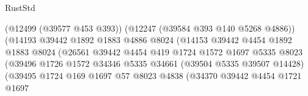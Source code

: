 \begin{lexlean}{RustStd}
\begin{coremodule}
{\begin{coremodule}
{{{{{{{{{{{{{{{{{{{{{{{{{{{{{{{{{{{{{{{{{{{{{{{{{{{{{{{{{{{{{{{{{{{{{{{{{{{{{{{{                                                (@12499 (@39577 @453 @393))
                                                (@12247 (@39584 @393 @140 @5268 @4886))
                                                (@14193
                                                  @39442
                                                  @1892
                                                  @1883
                                                  @4886
                                                  @8024
                                                  (@14153
                                                    @39442
                                                    @4454
                                                    @1892
                                                    @1883
                                                    @8024
                                                    (@26561
                                                      @39442
                                                      @4454
                                                      @419
                                                      @1724
                                                      @1572
                                                      @1697
                                                      @5335
                                                      @8023
                                                      (@39496
                                                        @1726
                                                        @1572
                                                        @34346
                                                        @5335
                                                        @34661
                                                        (@39504 @5335 @39507 @14428)
                                                        (@39495
                                                          @1724
                                                          @169
                                                          @1697
                                                          @57
                                                          @8023
                                                          @4838
                                                          (@34370
                                                            @39442
                                                            @4454
                                                            @1721
                                                            @1697
}}}}}}}}}}}}}}}}}}}}}}}}}}}}}}}}}}}}}}}}}}}}}}}}}}}}}}}}}}}}}}}}}}}}}}}}}}}}}}}}
\end{coremodule}}
\end{coremodule}
\end{lexlean}
